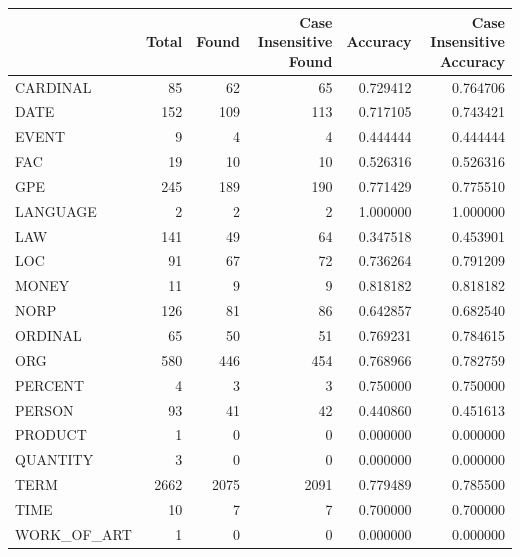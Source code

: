 \begin{tabular}{lrrrrr}
\toprule
 & Total & Found & Case Insensitive Found & Accuracy & Case Insensitive Accuracy \\
\midrule
CARDINAL & 85 & 62 & 65 & 0.729412 & 0.764706 \\
DATE & 152 & 109 & 113 & 0.717105 & 0.743421 \\
EVENT & 9 & 4 & 4 & 0.444444 & 0.444444 \\
FAC & 19 & 10 & 10 & 0.526316 & 0.526316 \\
GPE & 245 & 189 & 190 & 0.771429 & 0.775510 \\
LANGUAGE & 2 & 2 & 2 & 1.000000 & 1.000000 \\
LAW & 141 & 49 & 64 & 0.347518 & 0.453901 \\
LOC & 91 & 67 & 72 & 0.736264 & 0.791209 \\
MONEY & 11 & 9 & 9 & 0.818182 & 0.818182 \\
NORP & 126 & 81 & 86 & 0.642857 & 0.682540 \\
ORDINAL & 65 & 50 & 51 & 0.769231 & 0.784615 \\
ORG & 580 & 446 & 454 & 0.768966 & 0.782759 \\
PERCENT & 4 & 3 & 3 & 0.750000 & 0.750000 \\
PERSON & 93 & 41 & 42 & 0.440860 & 0.451613 \\
PRODUCT & 1 & 0 & 0 & 0.000000 & 0.000000 \\
QUANTITY & 3 & 0 & 0 & 0.000000 & 0.000000 \\
TERM & 2662 & 2075 & 2091 & 0.779489 & 0.785500 \\
TIME & 10 & 7 & 7 & 0.700000 & 0.700000 \\
WORK_OF_ART & 1 & 0 & 0 & 0.000000 & 0.000000 \\
\bottomrule
\end{tabular}
